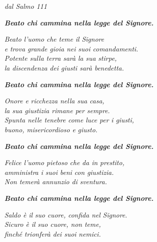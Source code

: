 \documentclass[10pt,b6paper,usenames,twoside]{article}
\begin{document}
\noindent \textcolor{forestgreen(traditional)}{\Acht}\hspace*{0mm} \textit{dal Salmo 111}
\\ 

\hfill\begin{minipage}{\dimexpr\textwidth-1cm}
\textbf{\textit{Beato chi cammina nella legge del Signore.}}\\
\end{minipage}

\noindent \textit{Beato l'uomo che teme il Signore\\ 
e trova grande gioia nei suoi comandamenti.\\ 
Potente sulla terra sarà la sua stirpe,\\ 
la discendenza dei giusti sarà benedetta.}\\ 

\hfill\begin{minipage}{\dimexpr\textwidth-1cm}
\textbf{\textit{Beato chi cammina nella legge del Signore.}}\\
\end{minipage}

\noindent \textit{Onore e ricchezza nella sua casa,\\
la sua giustizia rimane per sempre.\\
Spunta nelle tenebre come luce per i giusti,\\
buono, misericordioso e giusto.}\\

\hfill\begin{minipage}{\dimexpr\textwidth-1cm}
\textbf{\textit{Beato chi cammina nella legge del Signore.}}\\
\end{minipage}

\noindent \textit{Felice l'uomo pietoso che da in prestito,\\
amministra i suoi beni con giustizia.\\
Non temerà annunzio di sventura.}\\

\hfill\begin{minipage}{\dimexpr\textwidth-1cm}
\textbf{\textit{Beato chi cammina nella legge del Signore.}}\\
\end{minipage}

\noindent \textit{Saldo è il suo cuore, confida nel Signore.\\
Sicuro è il suo cuore, non teme,\\
finché trionferà dei suoi nemici.}\\
\end{document}
